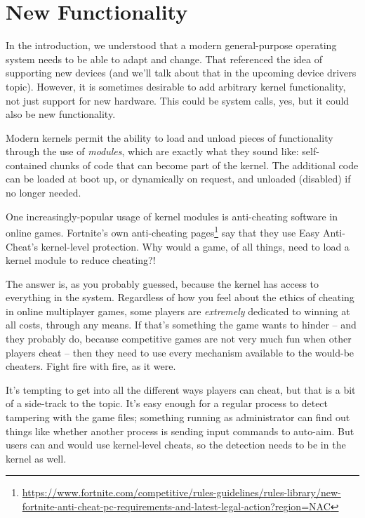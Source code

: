 




\section*{New Functionality}
In the introduction, we understood that a modern general-purpose operating system needs to be able to adapt and change. That referenced the idea of supporting new devices (and we'll talk about that in the upcoming device drivers topic). However, it is sometimes desirable to add arbitrary kernel functionality, not just support for new hardware. This could be system calls, yes, but it could also be new functionality.

Modern kernels permit the ability to load and unload pieces of functionality through the use of \textit{modules}, which are exactly what they sound like: self-contained chunks of code that can become part of the kernel. The additional code can be loaded at boot up, or dynamically on request, and unloaded (disabled) if no longer needed.

One increasingly-popular usage of kernel modules is anti-cheating software in online games. Fortnite's own anti-cheating pages\footnote{ \url{https://www.fortnite.com/competitive/rules-guidelines/rules-library/new-fortnite-anti-cheat-pc-requirements-and-latest-legal-action?region=NAC} } say that they use Easy Anti-Cheat's kernel-level protection. Why would a game, of all things, need to load a kernel module to reduce cheating?! 

The answer is, as you probably guessed, because the kernel has access to everything in the system. Regardless of how you feel about the ethics of cheating in online multiplayer games, some players are \textit{extremely} dedicated to winning at all costs, through any means. If that's something the game wants to hinder -- and they probably do, because competitive games are not very much fun when other players cheat -- then they need to use every mechanism available to the would-be cheaters. Fight fire with fire, as it were.

It's tempting to get into all the different ways players can cheat, but that is a bit of a side-track to the topic. It's easy enough for a regular process to detect tampering with the game files; something running as administrator can find out things like whether another process is sending input commands to auto-aim. But users can and would use kernel-level cheats, so the detection needs to be in the kernel as well. 

